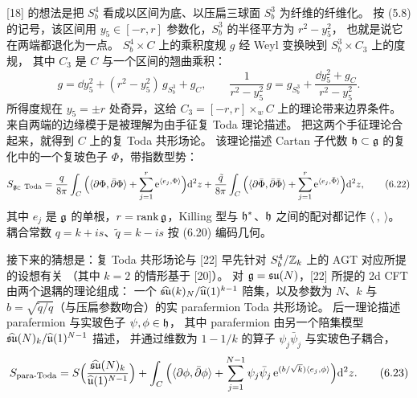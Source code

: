 [18] 的想法是把 $S^4_b$ 看成以区间为底、以压扁三球面 $S^3_b$ 为纤维的纤维化。
按 (5.8) 的记号，该区间用 $y_5\in[-r,r]$ 参数化，$S^3_b$ 的半径平方为 $r^2-y_5^2$，
也就是说它在两端都退化为一点。
$S^4_b\times C$ 上的乘积度规 $g$ 经 Weyl 变换映到 $S^3_b\times C_3$ 上的度规，
其中 $C_3$ 是 $C$ 与一个区间的翘曲乘积：
\begin{equation}
g=\dd y_5^2+(r^2-y_5^2)\,g_{S^3_b}+g_C,\qquad
\frac{1}{r^2-y_5^2}\,g=g_{S^3_b}+\frac{\dd y_5^2+g_C}{r^2-y_5^2}.
\tag{6.21}
\end{equation}
所得度规在 $y_5=\pm r$ 处奇异，这给 $C_3=[-r,r]\times_w C$ 上的理论带来边界条件。
来自两端的边缘模于是被理解为由手征复 Toda 理论描述。
把这两个手征理论合起来，就得到 $C$ 上的复 Toda 共形场论。
该理论描述 Cartan 子代数 $\mathfrak{h}\subset\mathfrak{g}$ 的复化中的一个复玻色子 $\Phi$，带指数型势：
\begin{equation}
S_{\mathfrak{g}_{\mathbb{C}}\ \text{Toda}}
=\frac{q}{8\pi}\int_C\Big(\langle\partial\Phi,\bar\partial\Phi\rangle
+\sum_{j=1}^{r}\mathrm{e}^{\langle e_j,\Phi\rangle}\Big)\mathrm{d}^2z
+\frac{\tilde q}{8\pi}\int_C\Big(\langle\partial\bar\Phi,\bar\partial\bar\Phi\rangle
+\sum_{j=1}^{r}\mathrm{e}^{\langle e_j,\bar\Phi\rangle}\Big)\mathrm{d}^2z,
\tag{6.22}
\end{equation}
其中 $e_j$ 是 $\mathfrak{g}$ 的单根，$r=\operatorname{rank}\mathfrak{g}$，Killing 型与 $\mathfrak{h}^*$、$\mathfrak{h}$ 之间的配对都记作 $\langle\ ,\ \rangle$。
耦合常数 $q=k+is$、$\tilde q=k-is$ 按 (6.20) 编码几何。

接下来的猜想是：复 Toda 共形场论与 [22] 早先针对 $S^4_b/\mathbb{Z}_k$ 上的 AGT 对应所提的设想有关
（其中 $k=2$ 的情形基于 [20]）。
对 $\mathfrak{g}=\mathfrak{su}(N)$，[22] 所提的 2d CFT 由两个退耦的理论组成：
一个 $\widehat{\mathfrak{su}}(k)_N/\widehat{\mathfrak{u}}(1)^{k-1}$ 陪集，以及参数为 $N$、$k$
与 $b=\sqrt{\tilde q/q}$（与压扁参数吻合）的实 parafermion Toda 共形场论。
后一理论描述 parafermion 与实玻色子 $\psi,\phi\in\mathfrak{h}$，
其中 parafermion 由另一个陪集模型 $\widehat{\mathfrak{su}}(N)_k/\widehat{\mathfrak{u}}(1)^{N-1}$ 描述，
并通过维数为 $1-1/k$ 的算子 $\psi_j\bar\psi_j$ 与实玻色子耦合，
\begin{equation}
S_{\text{para-Toda}}
=S\Big(\frac{\widehat{\mathfrak{su}}(N)_k}{\widehat{\mathfrak{u}}(1)^{N-1}}\Big)
+\int_C\Big(\langle\partial\phi,\bar\partial\phi\rangle
+\sum_{j=1}^{N-1}\psi_j\bar\psi_j\,\mathrm{e}^{(b/\sqrt{k})\langle e_j,\phi\rangle}\Big)\mathrm{d}^2z.
\tag{6.23}
\end{equation}


